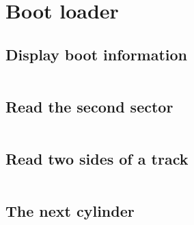 \documentclass{swfcthesis}
\begin{document}
\section{Boot loader}

\subsection{Display boot information}
\label{sec:dis-boo-inf}

\inputminted[firstline=55, lastline=65,
  linenos=true]{nasm}{../../src/06day/RongC/ipl10.asm}

\subsection{Read the second sector}
\label{sec:rea-sec-sec}
  
\inputminted[firstline=87,lastline=106,linenos=true]{nasm}{../../src/06day/RongC/ipl10.asm}

\subsection{Read two sides of a track}
\label{sec:rea-two-sid}

\inputminted[firstline=108,lastline=132,linenos=true]{nasm}{../../src/06day/RongC/ipl10.asm}

\subsection{The next cylinder}
\label{sec:the-nex-cyl}

\inputminted[firstline=134,lastline=137,linenos=true]{nasm}{../../src/06day/RongC/ipl10.asm}
\end{document}

